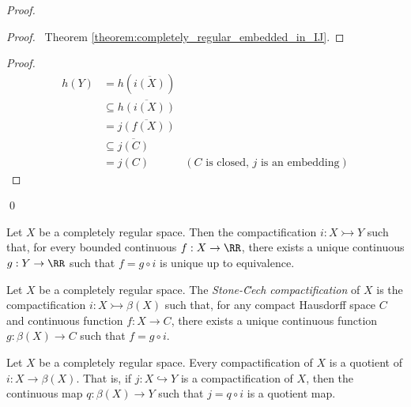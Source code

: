 \begin{proof}
    \pf
    \begin{proof}
        \pf\ Theorem \ref{theorem:completely_regular_embedded_in_IJ}.
    \end{proof}
    \begin{proof}
        \pf
        \begin{align*}
            h(Y) & = h(\overline{i(X)}) \\
            & \subseteq \overline{h(i(X))} \\
            & = \overline{j(f(X))} \\
            & \subseteq \overline{j(C)} \\
            & = j(C) & (\text{$C$ is closed, $j$ is an embedding})
        \end{align*}
    \end{proof}
    \qed
\end{proof}

\begin{corollary}
    Let $X$ be a completely regular space. Then the compactification $i : X \rightarrowtail Y$
    such that, for every bounded continuous $f : X \rightarrow \RR$, there exists a unique continuous
    $g : Y \rightarrow \RR$ such that $f = g \circ i$ is unique up to equivalence.
\end{corollary}

\begin{definition}
    Let $X$ be a completely regular space. The \emph{Stone-\u{C}ech compactification} of $X$ is the compactification
    $i : X \rightarrowtail \beta(X)$ such that, for any compact Hausdorff space $C$ and continuous function
    $f : X \rightarrow C$, there exists a unique continuous function $g : \beta(X) \rightarrow C$ such that
    $f = g \circ i$.
\end{definition}

\begin{proposition}
    Let $X$ be a completely regular space. Every compactification of $X$ is a quotient of $i : X \rightarrow \beta(X)$.
    That is, if $j : X \hookrightarrow Y$ is a compactification of $X$, then the continuous map
    $q : \beta(X) \rightarrow Y$ such that $j = q \circ i$ is a quotient map.
\end{proposition}

